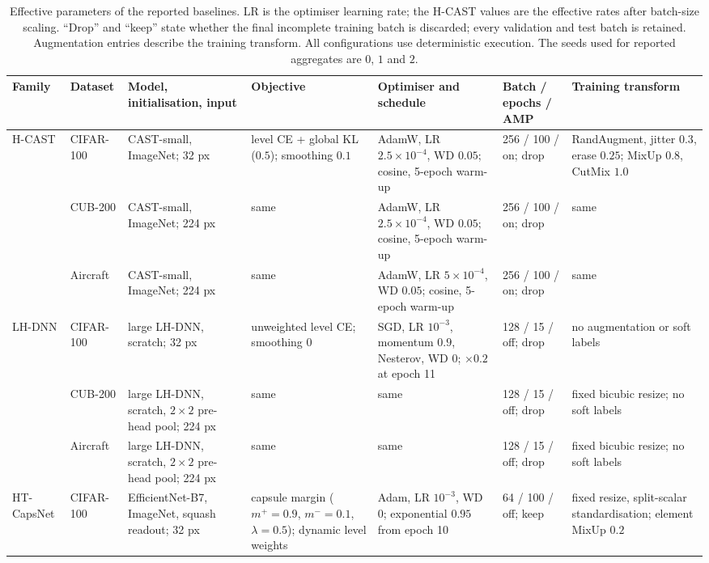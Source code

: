 \begin{table}[p]
\centering
\caption{Effective parameters of the reported baselines. LR is the optimiser
learning rate; the H-CAST values are the effective rates after batch-size
scaling. ``Drop'' and ``keep'' state whether the final incomplete training batch
is discarded; every validation and test batch is retained. Augmentation entries
describe the training transform. All configurations use deterministic execution.
The seeds used for reported aggregates are $0$, $1$ and $2$.}
\label{tab:app_baseline_configs}
\begingroup
\scriptsize
\setlength{\tabcolsep}{2pt}
\begin{tabularx}{\linewidth}{@{}L{1.15cm}L{1.35cm}L{2.35cm}L{2.65cm}L{2.85cm}L{1.55cm}Y@{}}
\toprule
\textbf{Family} & \textbf{Dataset} & \textbf{Model, initialisation, input} &
\textbf{Objective} & \textbf{Optimiser and schedule} &
\textbf{Batch / epochs / AMP} & \textbf{Training transform} \\
\midrule
H-CAST & CIFAR-100 & CAST-small, ImageNet; 32 px & level CE + global KL
($0.5$); smoothing $0.1$ & AdamW, LR $2.5\!\times\!10^{-4}$, WD $0.05$;
cosine, 5-epoch warm-up & 256 / 100 / on; drop & RandAugment, jitter $0.3$,
erase $0.25$; MixUp $0.8$, CutMix $1.0$ \\
& CUB-200 & CAST-small, ImageNet; 224 px & same & AdamW, LR
$2.5\!\times\!10^{-4}$, WD $0.05$; cosine, 5-epoch warm-up & 256 / 100 /
on; drop & same \\
& Aircraft & CAST-small, ImageNet; 224 px & same & AdamW, LR
$5\!\times\!10^{-4}$, WD $0.05$; cosine, 5-epoch warm-up & 256 / 100 / on;
drop & same \\
\midrule
LH-DNN & CIFAR-100 & large LH-DNN, scratch; 32 px & unweighted level CE;
smoothing $0$ & SGD, LR $10^{-3}$, momentum $0.9$, Nesterov, WD $0$;
$\times0.2$ at epoch 11 & 128 / 15 / off; drop & no augmentation or soft
labels \\
& CUB-200 & large LH-DNN, scratch, $2\!\times\!2$ pre-head pool; 224 px &
same & same & 128 / 15 / off; drop & fixed bicubic resize; no soft labels \\
& Aircraft & large LH-DNN, scratch, $2\!\times\!2$ pre-head pool; 224 px &
same & same & 128 / 15 / off; drop & fixed bicubic resize; no soft labels \\
\midrule
HT-CapsNet & CIFAR-100 & EfficientNet-B7, ImageNet, squash readout; 32 px & capsule margin
($m^+=0.9$, $m^-=0.1$, $\lambda=0.5$); dynamic level weights & Adam, LR
$10^{-3}$, WD $0$; exponential $0.95$ from epoch 10 & 64 / 100 / off; keep &
fixed resize, split-scalar standardisation; element MixUp $0.2$ \\

\end{tabularx}
\end{table}
